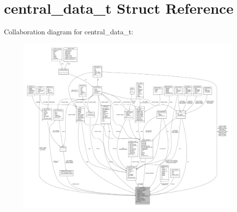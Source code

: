 \hypertarget{structcentral__data__t}{\section{central\+\_\+data\+\_\+t Struct Reference}
\label{structcentral__data__t}
}


Collaboration diagram for central\+\_\+data\+\_\+t\+:
\nopagebreak
\begin{figure}[H]
\begin{center}
\leavevmode
\includegraphics[width=350pt]{structcentral__data__t__coll__graph}
\end{center}
\end{figure}
